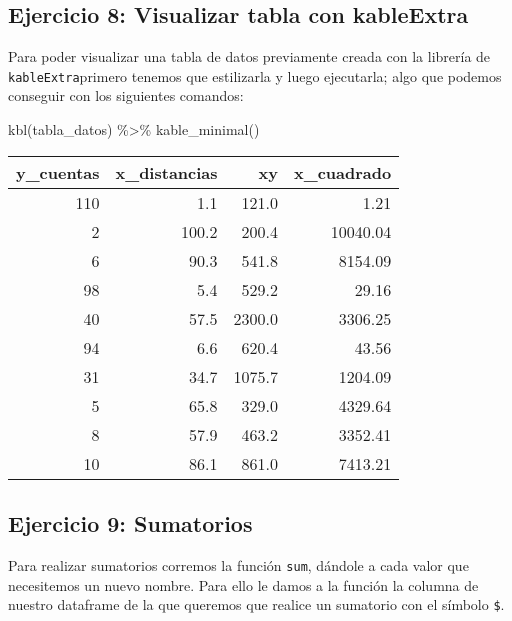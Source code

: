 \documentclass[
]{article}
\newenvironment{Shaded}{\begin{snugshade}}{\end{snugshade}}
\newcommand{\FunctionTok}[1]{\textcolor[rgb]{0.00,0.00,0.00}{#1}}
\newcommand{\NormalTok}[1]{#1}
\newcommand{\SpecialCharTok}[1]{\textcolor[rgb]{0.00,0.00,0.00}{#1}}
\begin{document}
\hypertarget{ejercicio-8-visualizar-tabla-con-kableextra}{%
\subsection{Ejercicio 8: Visualizar tabla con
kableExtra}\label{ejercicio-8-visualizar-tabla-con-kableextra}}

Para poder visualizar una tabla de datos previamente creada con la
librería de \texttt{kableExtra}primero tenemos que estilizarla y luego
ejecutarla; algo que podemos conseguir con los siguientes comandos:

\begin{Shaded}
\begin{Highlighting}[]
\FunctionTok{kbl}\NormalTok{(tabla\_datos) }\SpecialCharTok{\%\textgreater{}\%}
  \FunctionTok{kable\_minimal}\NormalTok{()}
\end{Highlighting}
\end{Shaded}

\begin{table}
\centering
\begin{tabular}[t]{r|r|r|r}
\hline
y\_cuentas & x\_distancias & xy & x\_cuadrado\\
\hline
110 & 1.1 & 121.0 & 1.21\\
\hline
2 & 100.2 & 200.4 & 10040.04\\
\hline
6 & 90.3 & 541.8 & 8154.09\\
\hline
98 & 5.4 & 529.2 & 29.16\\
\hline
40 & 57.5 & 2300.0 & 3306.25\\
\hline
94 & 6.6 & 620.4 & 43.56\\
\hline
31 & 34.7 & 1075.7 & 1204.09\\
\hline
5 & 65.8 & 329.0 & 4329.64\\
\hline
8 & 57.9 & 463.2 & 3352.41\\
\hline
10 & 86.1 & 861.0 & 7413.21\\
\hline
\end{tabular}
\end{table}

\hypertarget{ejercicio-9-sumatorios}{%
\subsection{Ejercicio 9: Sumatorios}\label{ejercicio-9-sumatorios}}

Para realizar sumatorios corremos la función \texttt{sum}, dándole a
cada valor que necesitemos un nuevo nombre. Para ello le damos a la
función la columna de nuestro dataframe de la que queremos que realice
un sumatorio con el símbolo \texttt{\$}.
\end{document}
